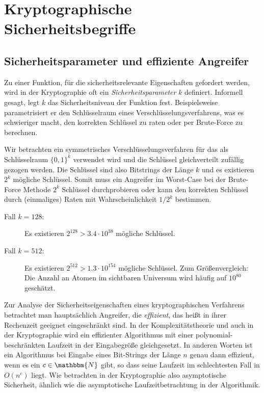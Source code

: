 \chapter{Kryptographische Sicherheitsbegriffe}\label{chap:krypt-begriffe}
\section{Sicherheitsparameter und effiziente Angreifer}\label{sec:secparam}
Zu einer Funktion, für die sicherheitsrelevante Eigenschaften gefordert werden, wird in der Kryptographie oft ein \emph{Sicherheitsparameter} $k$ definiert. Informell gesagt, legt $k$ das Sicherheitsniveau der Funktion fest. Beispielsweise parametrisiert er den Schlüsselraum eines Verschlüsselungsverfahrens, was es schwieriger macht, den korrekten Schlüssel zu raten oder per Brute-Force zu berechnen.
\begin{beispiel}
	Wir betrachten ein symmetrisches Verschlüsselungsverfahren für das als Schlüsselraum $\{0,1\}^k$ verwendet wird und die Schlüssel gleichverteilt zufällig gezogen werden. Die Schlüssel sind also Bitstrings der Länge $k$ und es existieren $2^k$ mögliche Schlüssel. Somit muss ein Angreifer im Worst-Case bei der Brute-Force Methode $2^k$ Schlüssel durchprobieren oder kann den korrekten Schlüssel durch (einmaliges) Raten mit Wahrscheinlichkeit $1/2^k$ bestimmen. 
	\begin{description}
		\item[Fall $k=128$:] Es existieren $2^{128} > 3.4 \cdot  10^{38}$ mögliche Schlüssel. 
		\item[Fall $k=512$:] Es existieren $2^{512} > 1.3 \cdot 10^{154}$ mögliche Schlüssel. Zum Größenvergleich: 
		Die Anzahl an Atomen im sichtbaren Universum wird häufig auf $10^{80}$ geschätzt.  
	\end{description}
	
\end{beispiel}

Zur Analyse der Sicherheitseigenschaften eines kryptographischen Verfahrens betrachtet man hauptsächlich Angreifer, die \emph{effizient}, das heißt in ihrer Rechenzeit geeignet eingeschränkt sind. In der Komplexitätstheorie und auch in der Kryptographie wird ein effizienter Algorithmus mit einer polynomial-beschränkten Laufzeit in der Eingabegröße gleichgesetzt. 
In anderen Worten ist ein Algorithmus bei Eingabe eines Bit-Strings der Länge $n$ genau dann effizient, wenn es ein $c \in \mathbbm{N}$ gibt, so dass seine Laufzeit im schlechtesten Fall in $O(n^c)$ liegt. Wie betrachten in der Kryptographie also asymptotische Sicherheit, ähnlich wie die asymptotische Laufzeitbetrachtung in der Algorithmik.

